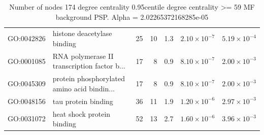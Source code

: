 \begin{table}[ht]
\begin{adjustbox}{max width=\textwidth}
\begin{tabular}{llrrrrr}
  GO:0042826 & histone deacetylase binding & 25 & 10 & 1.3 & $2.10 \times 10^{-7}$ & $5.19 \times 10^{-4}$ \\ 
  GO:0001085 & RNA polymerase II transcription factor b... & 17 & 8 & 0.9 & $8.10 \times 10^{-7}$ & $2.00 \times 10^{-3}$ \\ 
  GO:0045309 & protein phosphorylated amino acid bindin... & 17 & 8 & 0.9 & $8.10 \times 10^{-7}$ & $2.00 \times 10^{-3}$ \\ 
  GO:0048156 & tau protein binding & 36 & 11 & 1.9 & $1.20 \times 10^{-6}$ & $2.97 \times 10^{-3}$ \\ 
  GO:0031072 & heat shock protein binding & 52 & 13 & 2.7 & $1.60 \times 10^{-6}$ & $3.96 \times 10^{-3}$ \\ 
   \hline
\end{tabular}
\end{adjustbox}
\caption{Number of nodes 174 degree centrality 0.95centile  degree centrality >= 59 MF background PSP. Alpha = 2.02265372168285e-05} 
\label{tab:Number of nodes 174 degree centrality 0.95centile  degree centrality >= 59 MF background PSP. Alpha = 2.02265372168285e-05}
\end{table}



